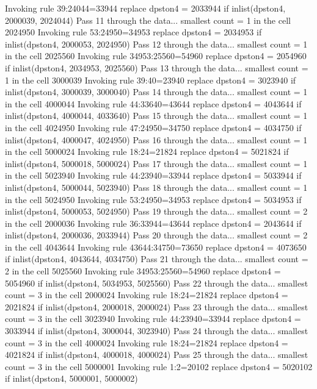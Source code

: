   Invoking rule 39:24044=33944
  replace dpston4 = 2033944 if inlist(dpston4, 2000039, 2024044)
Pass 11 through the data...
  smallest count = 1 in the cell      2024950
  Invoking rule 53:24950=34953
  replace dpston4 = 2034953 if inlist(dpston4, 2000053, 2024950)
Pass 12 through the data...
  smallest count = 1 in the cell      2025560
  Invoking rule 34953:25560=54960
  replace dpston4 = 2054960 if inlist(dpston4, 2034953, 2025560)
Pass 13 through the data...
  smallest count = 1 in the cell      3000039
  Invoking rule 39:40=23940
  replace dpston4 = 3023940 if inlist(dpston4, 3000039, 3000040)
Pass 14 through the data...
  smallest count = 1 in the cell      4000044
  Invoking rule 44:33640=43644
  replace dpston4 = 4043644 if inlist(dpston4, 4000044, 4033640)
Pass 15 through the data...
  smallest count = 1 in the cell      4024950
  Invoking rule 47:24950=34750
  replace dpston4 = 4034750 if inlist(dpston4, 4000047, 4024950)
Pass 16 through the data...
  smallest count = 1 in the cell      5000024
  Invoking rule 18:24=21824
  replace dpston4 = 5021824 if inlist(dpston4, 5000018, 5000024)
Pass 17 through the data...
  smallest count = 1 in the cell      5023940
  Invoking rule 44:23940=33944
  replace dpston4 = 5033944 if inlist(dpston4, 5000044, 5023940)
Pass 18 through the data...
  smallest count = 1 in the cell      5024950
  Invoking rule 53:24950=34953
  replace dpston4 = 5034953 if inlist(dpston4, 5000053, 5024950)
Pass 19 through the data...
  smallest count = 2 in the cell      2000036
  Invoking rule 36:33944=43644
  replace dpston4 = 2043644 if inlist(dpston4, 2000036, 2033944)
Pass 20 through the data...
  smallest count = 2 in the cell      4043644
  Invoking rule 43644:34750=73650
  replace dpston4 = 4073650 if inlist(dpston4, 4043644, 4034750)
Pass 21 through the data...
  smallest count = 2 in the cell      5025560
  Invoking rule 34953:25560=54960
  replace dpston4 = 5054960 if inlist(dpston4, 5034953, 5025560)
Pass 22 through the data...
  smallest count = 3 in the cell      2000024
  Invoking rule 18:24=21824
  replace dpston4 = 2021824 if inlist(dpston4, 2000018, 2000024)
Pass 23 through the data...
  smallest count = 3 in the cell      3023940
  Invoking rule 44:23940=33944
  replace dpston4 = 3033944 if inlist(dpston4, 3000044, 3023940)
Pass 24 through the data...
  smallest count = 3 in the cell      4000024
  Invoking rule 18:24=21824
  replace dpston4 = 4021824 if inlist(dpston4, 4000018, 4000024)
Pass 25 through the data...
  smallest count = 3 in the cell      5000001
  Invoking rule 1:2=20102
  replace dpston4 = 5020102 if inlist(dpston4, 5000001, 5000002)
